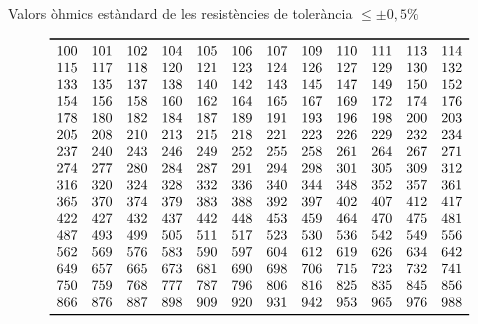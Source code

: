 \begin{table}[htb]
   \caption{Valors \`{o}hmics est\`{a}ndard de les resist\`{e}ncies de toler\`{a}ncia $\leq\pm0{,}5\unit{\%}$}
   \[ \begin{array}{cccccccccccc}
   \toprule[1pt]
   100 & 101 & 102 & 104 & 105 & 106 & 107 & 109 & 110 & 111 & 113 & 114 \\
   115 & 117 & 118 & 120 & 121 & 123 & 124 & 126 & 127 & 129 & 130 & 132 \\
   133 & 135 & 137 & 138 & 140 & 142 & 143 & 145 & 147 & 149 & 150 & 152 \\
   154 & 156 & 158 & 160 & 162 & 164 & 165 & 167 & 169 & 172 & 174 & 176 \\
   178 & 180 & 182 & 184 & 187 & 189 & 191 & 193 & 196 & 198 & 200 & 203 \\
   205 & 208 & 210 & 213 & 215 & 218 & 221 & 223 & 226 & 229 & 232 & 234 \\
   237 & 240 & 243 & 246 & 249 & 252 & 255 & 258 & 261 & 264 & 267 & 271 \\
   274 & 277 & 280 & 284 & 287 & 291 & 294 & 298 & 301 & 305 & 309 & 312 \\
   316 & 320 & 324 & 328 & 332 & 336 & 340 & 344 & 348 & 352 & 357 & 361 \\
   365 & 370 & 374 & 379 & 383 & 388 & 392 & 397 & 402 & 407 & 412 & 417 \\
   422 & 427 & 432 & 437 & 442 & 448 & 453 & 459 & 464 & 470 & 475 & 481 \\
   487 & 493 & 499 & 505 & 511 & 517 & 523 & 530 & 536 & 542 & 549 & 556 \\
   562 & 569 & 576 & 583 & 590 & 597 & 604 & 612 & 619 & 626 & 634 & 642 \\
   649 & 657 & 665 & 673 & 681 & 690 & 698 & 706 & 715 & 723 & 732 & 741 \\
   750 & 759 & 768 & 777 & 787 & 796 & 806 & 816 & 825 & 835 & 845 & 856 \\
   866 & 876 & 887 & 898 & 909 & 920 & 931 & 942 & 953 & 965 & 976 & 988 \\

   \bottomrule[1pt]
   \end{array}   \]
\end{table}
